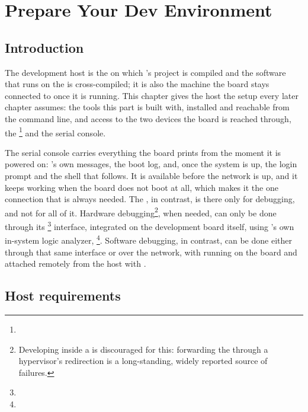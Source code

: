 \chapter{Prepare Your Dev Environment}
\label{chap:fpgalix-devenv}

\section{Introduction}

The development host is the  on which 's  project is compiled and the software that runs on the  is cross-compiled; it is also the machine the  board stays connected to once it is running. This chapter gives the host the setup every later chapter assumes: the tools this part is built with, installed and reachable from the command line, and access to the two  devices the board is reached through, the \footnote{} and the serial console.

The serial console carries everything the board prints from the moment it is powered on: 's own messages, the  boot log, and, once the system is up, the login prompt and the shell that follows. It is available before the network is up, and it keeps working when the board does not boot at all, which makes it the one connection that is always needed. The , in contrast, is there only for debugging, and not for all of it. Hardware debugging\footnote{Developing inside a  is discouraged for this: forwarding the  through a hypervisor's  redirection is a long-standing, widely reported source of  failures.}, when needed, can only be done through its \footnote{} interface, integrated on the development board itself, using 's own in-system logic analyzer, \footnote{}. Software debugging, in contrast, can be done either through that same interface or over the network, with  running on the board and attached remotely from the host with .

\section{Host requirements}

